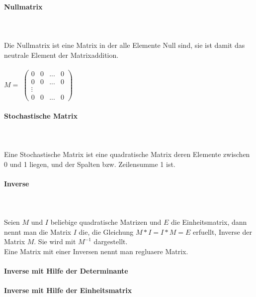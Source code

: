 \documentclass[a4paper]{article} %
\begin{document}
		\paragraph{Nullmatrix  } 
		\hspace{0 cm} \\ \noindent \\
		Die Nullmatrix ist eine Matrix in der alle Elemente Null sind, sie ist damit das neutrale Element der Matrixaddition.\\
		\\$M =$
		$
		\begin{pmatrix}
		0 & 0 	& ... 	& 0\\
		0 & 0 	& ...	& 0\\
		\vdots  &      	&  \\
		0 & 0	& ...	& 0
		\end{pmatrix}
		$\\
	
	\paragraph{Stochastische Matrix  } 
	\hspace{0 cm} \\ \noindent \\
	Eine Stochastische Matrix ist eine quadratische Matrix deren Elemente zwischen 0 und 1 liegen, und der Spalten bzw. Zeilensumme 1 ist.
	
	\paragraph{Inverse  } 
	 \hspace{0 cm} \\ \noindent \\
	 Seien  $M$ und $I$ beliebige quadratische Matrizen und $E$ die Einheitsmatrix, dann nennt man die Matrix $I$ die, die Gleichung $M*I=I*M=E$ erfuellt, Inverse der Matrix $M$. Sie wird mit $M^{-1}$ dargestellt.\\
	 Eine Matrix mit einer Inversen nennt man regluaere Matrix.
	 \\\\\textbf{Inverse mit Hilfe der Determinante}
	 \\\\\textbf{Inverse mit Hilfe der Einheitsmatrix}
\end{document}
